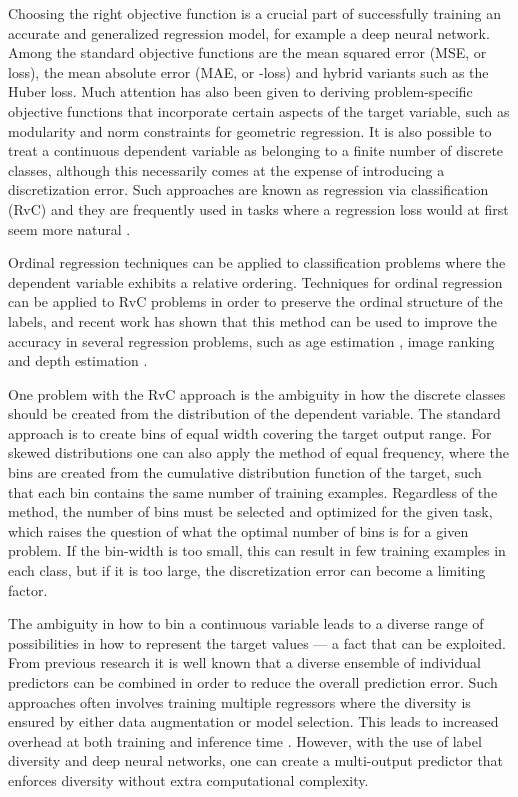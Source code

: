 \documentclass[10pt, conference, a4paper]{IEEEtran}
\begin{document}
Choosing the right objective function is a crucial part of successfully training an accurate and generalized regression model, for example a deep neural network. Among the standard objective functions are the mean squared error (MSE, or  loss), the mean absolute error (MAE, or -loss) and hybrid variants such as the Huber loss. Much attention has also been given to deriving problem-specific objective functions that incorporate certain aspects of the target variable, such as modularity and norm constraints for geometric regression. It is also possible to treat a continuous dependent variable as belonging to a finite number of discrete classes, although this necessarily comes at the expense of introducing a discretization error. Such approaches are known as regression via classification (RvC) and they are frequently used in tasks where a regression loss would at first seem more natural \cite{workman2016horizon, wang2015designing, zeisl2014discriminatively, tulsiani2015viewpoints, abbas2019geometric, rothe2015dex}. 

Ordinal regression techniques can be applied to classification problems where the dependent variable exhibits a relative ordering. Techniques for ordinal regression can be applied to RvC problems in order to preserve the ordinal structure of the labels, and recent work has shown that this method can be used to improve the accuracy in several regression problems, such as age estimation \cite{niu2016ordinal} \cite{beckham2017unimodal}, image ranking and depth estimation \cite{diaz2019soft}.

One problem with the RvC approach is the ambiguity in how the discrete classes should be created from the distribution of the dependent variable. The standard approach is to create bins of equal width covering the target output range. For skewed distributions one can also apply the method of equal frequency, where the bins are created from the cumulative distribution function of the target, such that each bin contains the same number of training examples. Regardless of the method, the number of bins must be selected and optimized for the given task, which raises the question of what the optimal number of bins is for a given problem. If the bin-width is too small, this can result in few training examples in each class, but if it is too large, the discretization error can become a limiting factor.

The ambiguity in how to bin a continuous variable leads to a diverse range of possibilities in how to represent the target values --- a fact that can be exploited. From previous research it is well known that a diverse ensemble of individual predictors can be combined in order to reduce the overall prediction error. Such approaches often involves training multiple regressors where the diversity is ensured by either data augmentation or model selection. This leads to increased overhead at both training and inference time \cite{ren2016ensemble}. However, with the use of label diversity and deep neural networks, one can create a multi-output predictor that enforces diversity without extra computational complexity.
\end{document}
